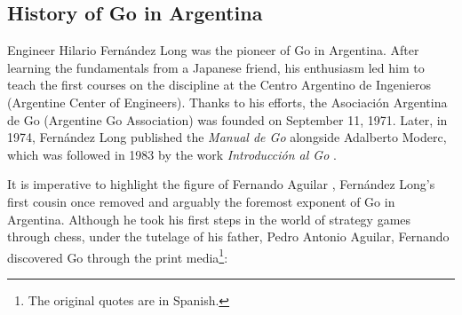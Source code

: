 \subsection{History of Go in Argentina}

Engineer Hilario Fernández Long was the pioneer of Go in Argentina. After learning the fundamentals from a Japanese friend, his enthusiasm led him to teach the first courses on the discipline at the Centro Argentino de Ingenieros (Argentine Center of Engineers). Thanks to his efforts, the Asociación Argentina de Go (Argentine Go Association) was founded on September 11, 1971. Later, in 1974, Fernández Long published the \textit{Manual de Go} alongside Adalberto Moderc, which was followed in 1983 by the work \textit{Introducción al Go} \cite{Long83}.  

It is imperative to highlight the figure of Fernando Aguilar \cite{Long_Hubert, Aguilar2, Aguilar1}, Fernández Long's first cousin once removed and arguably the foremost exponent of Go in Argentina. Although he took his first steps in the world of strategy games through chess, under the tutelage of his father, Pedro Antonio Aguilar, Fernando discovered Go through the print media\footnote{The original quotes are in Spanish.}:

